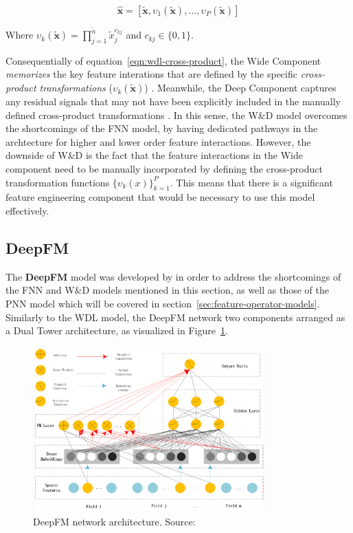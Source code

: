 \documentclass{mldsmsc}
\begin{document}
\begin{equation}
\label{eqn:wdl-cross-product}
\hat{\mathbf{x}} = [\tilde{\mathbf{x}}, \upsilon_1({\tilde{\mathbf{x}}}),\ldots , \upsilon_P({\tilde{\mathbf{x}}})]
\end{equation}

Where $\upsilon_k({\tilde{\mathbf{x}}}) = \prod_{j=1}^{\tilde{n}}\tilde{x}_j^{c_{kj}}$
and $c_{kj} \in \{ 0, 1 \}$.

Consequentially of equation~\ref{eqn:wdl-cross-product}, the Wide Component \emph{memorizes}
the key feature interations that are defined by the specific \emph{cross-product transformations}
($\upsilon_{k}(\tilde{\mathbf{x}})$) \citep{RefWorks:cheng2016wide}. Meanwhile, the Deep Component captures any residual
signals that may not have been explicitly included in the manually defined cross-product transformations
\citep{RefWorks:zhang2021deep}. In this sense, the W\&D model overcomes the
shortcomings of the FNN model, by having dedicated pathways in the archtecture
for higher and lower order feature interactions. However, the downside
of W\&D is the fact that the feature interactions in the Wide component
need to be manually incorporated by defining the cross-product transformation
functions $\{\upsilon_k(x)\}_{k=1}^{P}$. This means that there is a significant
feature engineering component that would be necessary to use this model effectively. 

\subsection{DeepFM}

The \textbf{DeepFM} model was developed by \cite{RefWorks:guo2017deepfm:} in order
to address the shortcomings of the FNN and W\&D models mentioned in this section, as 
well as those of the PNN model which will be covered in section~\ref{sec:feature-operator-models}.
Similarly to the WDL model, the DeepFM network two components arranged as a Dual Tower
architecture, as visualized in Figure~\ref{fig:deepfm}.

\begin{figure}[h]
    \centering
    \includegraphics[width=0.8\textwidth]{../figures/dfm.png}
    \caption{DeepFM network architecture. Source: \citep{RefWorks:shen2017deepctr:}}
    \label{fig:deepfm}
\end{figure}
\end{document}
